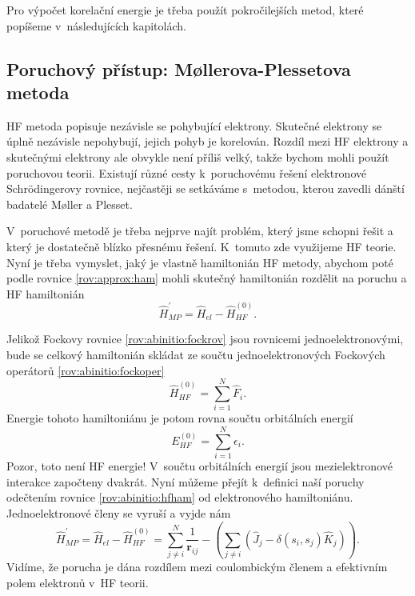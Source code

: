 Pro výpočet korelační energie je třeba použít pokročilejších metod, které popíšeme v~následujících kapitolách.

\subsection{Poruchový přístup: M\o llerova-Plessetova metoda}
HF metoda popisuje nezávisle se pohybující elektrony. Skutečné elektrony se úplně nezávisle nepohybují, jejich pohyb je korelován. Rozdíl mezi HF elektrony a skutečnými elektrony ale obvykle není příliš velký, takže bychom mohli použít poruchovou teorii.  Existují různé cesty k~poruchovému řešení elektronové Schr\"{o}dingerovy rovnice, nejčastěji se setkáváme s~metodou, kterou zavedli dánští badatelé M\o ller a Plesset.

V~poruchové metodě je třeba nejprve najít problém, který jsme schopni řešit a který je dostatečně blízko přesnému řešení. K~tomuto zde využijeme HF teorie. Nyní je třeba vymyslet, jaký je vlastně hamiltonián HF metody, abychom poté podle rovnice \eqref{rov:approx:ham} mohli skutečný hamiltonián rozdělit na poruchu a HF hamiltonián
\begin{equation}
\hat{H}^{\prime}_{MP}=\hat{H}_{el} - \hat{H}^{(0)}_{HF} .
\end{equation}

Jelikož Fockovy rovnice \ref{rov:abinitio:fockrov} jsou rovnicemi jednoelektronovými, bude se celkový hamiltonián skládat ze součtu jednoelektronových Fockových operátorů \ref{rov:abinitio:fockoper}
\begin{equation}
\hat{H}^{(0)}_{HF}= \sum_{i=1}^N \hat{F}_i.
\label{rov:abinitio:hfham}
\end{equation}
Energie tohoto hamiltoniánu je potom rovna součtu orbitálních energií
\begin{equation}
E^{(0)}_{HF}=\sum_{i=1}^N \epsilon_i .
\end{equation}
Pozor, toto není HF energie! V~součtu orbitálních energií jsou mezielektronové interakce započteny dvakrát. Nyní můžeme přejít k~definici naší poruchy odečtením rovnice \eqref{rov:abinitio:hfham} od elektronového hamiltoniánu. Jednoelektronové členy se vyruší a vyjde nám
\begin{equation}
\hat{H}^{\prime}_{MP}=\hat{H}_{el}-\hat{H}^{(0)}_{HF}= \sum_{j\neq i}^{N} \frac{1}{\textbf{r}_{ij}} - \left(\sum_{j\neq i} \left( \hat{J}_j - \delta(s_i,s_j) \hat{K}_j \right) \right) .
\end{equation}
Vidíme, že porucha je dána rozdílem mezi coulombickým členem a efektivním polem elektronů v~HF teorii.

